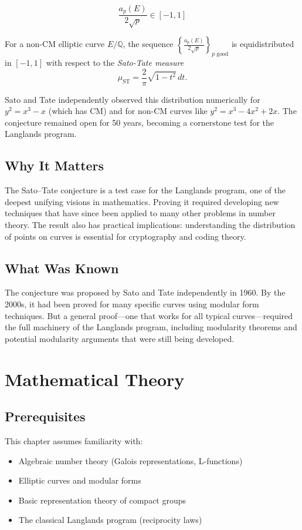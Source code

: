 \begin{equation}
\frac{a_p(E)}{2\sqrt{p}} \in [-1, 1]
\end{equation}

\begin{conjecture}
For a non-CM elliptic curve $E/\mathbb{Q}$, the sequence $\left\{ \frac{a_p(E)}{2\sqrt{p}} \right\}_{p \text{ good}}$ is equidistributed in $[-1, 1]$ with respect to the \emph{Sato-Tate measure}
\[
\mu_{\text{ST}} = \frac{2}{\pi} \sqrt{1 - t^2} \, dt.
\]
\end{conjecture}

\begin{historicalbox}
Sato and Tate independently observed this distribution numerically for $y^2 = x^3 - x$ (which has CM) and for non-CM curves like $y^2 = x^3 - 4x^2 + 2x$. The conjecture remained open for 50 years, becoming a cornerstone test for the Langlands program.
\end{historicalbox}

\subsection{Why It Matters}
The Sato--Tate conjecture is a test case for the Langlands program, one of the deepest unifying visions in mathematics. Proving it required developing new techniques that have since been applied to many other problems in number theory. The result also has practical implications: understanding the distribution of points on curves is essential for cryptography and coding theory.

\subsection{What Was Known}
The conjecture was proposed by Sato and Tate independently in 1960. By the 2000s, it had been proved for many specific curves using modular form techniques. But a general proof---one that works for all typical curves---required the full machinery of the Langlands program, including modularity theorems and potential modularity arguments that were still being developed.

\section{Mathematical Theory}


\subsection{Prerequisites}
This chapter assumes familiarity with:
\begin{itemize}
\item Algebraic number theory (Galois representations, L-functions)
\item Elliptic curves and modular forms
\item Basic representation theory of compact groups
\item The classical Langlands program (reciprocity laws)
\end{itemize}

